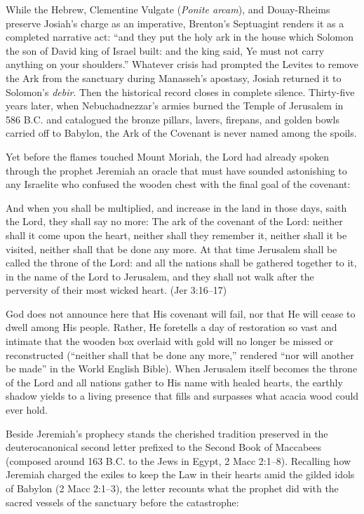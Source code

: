 While the Hebrew, Clementine Vulgate (\textit{Ponite arcam}), and Douay-Rheims preserve Josiah's charge as an imperative, Brenton's Septuagint renders it as a completed narrative act: ``and they put the holy ark in the house which Solomon the son of David king of Israel built: and the king said, Ye must not carry anything on your shoulders.'' Whatever crisis had prompted the Levites to remove the Ark from the sanctuary during Manasseh's apostasy, Josiah returned it to Solomon's \textit{debir}. Then the historical record closes in complete silence. Thirty-five years later, when Nebuchadnezzar's armies burned the Temple of Jerusalem in 586 B.C. and catalogued the bronze pillars, lavers, firepans, and golden bowls carried off to Babylon, the Ark of the Covenant is never named among the spoils.

Yet before the flames touched Mount Moriah, the Lord had already spoken through the prophet Jeremiah an oracle that must have sounded astonishing to any Israelite who confused the wooden chest with the final goal of the covenant:

\begin{scriptureblock}
And when you shall be multiplied, and increase in the land in those days, saith the Lord, they shall say no more: The ark of the covenant of the Lord: neither shall it come upon the heart, neither shall they remember it, neither shall it be visited, neither shall that be done any more. At that time Jerusalem shall be called the throne of the Lord: and all the nations shall be gathered together to it, in the name of the Lord to Jerusalem, and they shall not walk after the perversity of their most wicked heart. \textnormal{(Jer 3:16--17)}
\end{scriptureblock}

God does not announce here that His covenant will fail, nor that He will cease to dwell among His people. Rather, He foretells a day of restoration so vast and intimate that the wooden box overlaid with gold will no longer be missed or reconstructed (``neither shall that be done any more,'' rendered ``nor will another be made'' in the World English Bible). When Jerusalem itself becomes the throne of the Lord and all nations gather to His name with healed hearts, the earthly shadow yields to a living presence that fills and surpasses what acacia wood could ever hold.

Beside Jeremiah's prophecy stands the cherished tradition preserved in the deuterocanonical second letter prefixed to the Second Book of Maccabees (composed around 163 B.C. to the Jews in Egypt, 2 Macc 2:1--8). Recalling how Jeremiah charged the exiles to keep the Law in their hearts amid the gilded idols of Babylon (2 Macc 2:1--3), the letter recounts what the prophet did with the sacred vessels of the sanctuary before the catastrophe:

